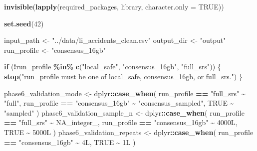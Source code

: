 \documentclass[
]{article}
\newenvironment{Shaded}{\begin{snugshade}}{\end{snugshade}}
\newcommand{\AttributeTok}[1]{\textcolor[rgb]{0.13,0.29,0.53}{#1}}
\newcommand{\ConstantTok}[1]{\textcolor[rgb]{0.56,0.35,0.01}{#1}}
\newcommand{\ControlFlowTok}[1]{\textcolor[rgb]{0.13,0.29,0.53}{\textbf{#1}}}
\newcommand{\DataTypeTok}[1]{\textcolor[rgb]{0.13,0.29,0.53}{#1}}
\newcommand{\DecValTok}[1]{\textcolor[rgb]{0.00,0.00,0.81}{#1}}
\newcommand{\FunctionTok}[1]{\textcolor[rgb]{0.13,0.29,0.53}{\textbf{#1}}}
\newcommand{\NormalTok}[1]{#1}
\newcommand{\OtherTok}[1]{\textcolor[rgb]{0.56,0.35,0.01}{#1}}
\newcommand{\SpecialCharTok}[1]{\textcolor[rgb]{0.81,0.36,0.00}{\textbf{#1}}}
\newcommand{\StringTok}[1]{\textcolor[rgb]{0.31,0.60,0.02}{#1}}
\begin{document}
\begin{Shaded}
\begin{Highlighting}[]
\FunctionTok{invisible}\NormalTok{(}\FunctionTok{lapply}\NormalTok{(required\_packages, library, }\AttributeTok{character.only =} \ConstantTok{TRUE}\NormalTok{))}

\FunctionTok{set.seed}\NormalTok{(}\DecValTok{42}\NormalTok{)}

\NormalTok{input\_path }\OtherTok{\textless{}{-}} \StringTok{"../data/li\_accidents\_clean.csv"}
\NormalTok{output\_dir }\OtherTok{\textless{}{-}} \StringTok{"output"}
\NormalTok{run\_profile }\OtherTok{\textless{}{-}} \StringTok{"consensus\_16gb"}

\ControlFlowTok{if}\NormalTok{ (}\SpecialCharTok{!}\NormalTok{run\_profile }\SpecialCharTok{\%in\%} \FunctionTok{c}\NormalTok{(}\StringTok{"local\_safe"}\NormalTok{, }\StringTok{"consensus\_16gb"}\NormalTok{, }\StringTok{"full\_srs"}\NormalTok{)) \{}
  \FunctionTok{stop}\NormalTok{(}\StringTok{"run\_profile must be one of \textquotesingle{}local\_safe\textquotesingle{}, \textquotesingle{}consensus\_16gb\textquotesingle{}, or \textquotesingle{}full\_srs\textquotesingle{}."}\NormalTok{)}
\NormalTok{\}}

\NormalTok{phase6\_validation\_mode }\OtherTok{\textless{}{-}}\NormalTok{ dplyr}\SpecialCharTok{::}\FunctionTok{case\_when}\NormalTok{(}
\NormalTok{  run\_profile }\SpecialCharTok{==} \StringTok{"full\_srs"} \SpecialCharTok{\textasciitilde{}} \StringTok{"full"}\NormalTok{,}
\NormalTok{  run\_profile }\SpecialCharTok{==} \StringTok{"consensus\_16gb"} \SpecialCharTok{\textasciitilde{}} \StringTok{"consensus\_sampled"}\NormalTok{,}
  \ConstantTok{TRUE} \SpecialCharTok{\textasciitilde{}} \StringTok{"sampled"}
\NormalTok{)}
\NormalTok{phase6\_validation\_sample\_n }\OtherTok{\textless{}{-}}\NormalTok{ dplyr}\SpecialCharTok{::}\FunctionTok{case\_when}\NormalTok{(}
\NormalTok{  run\_profile }\SpecialCharTok{==} \StringTok{"full\_srs"} \SpecialCharTok{\textasciitilde{}} \ConstantTok{NA\_integer\_}\NormalTok{,}
\NormalTok{  run\_profile }\SpecialCharTok{==} \StringTok{"consensus\_16gb"} \SpecialCharTok{\textasciitilde{}} \DecValTok{4000}\DataTypeTok{L}\NormalTok{,}
  \ConstantTok{TRUE} \SpecialCharTok{\textasciitilde{}} \DecValTok{5000}\DataTypeTok{L}
\NormalTok{)}
\NormalTok{phase6\_validation\_repeats }\OtherTok{\textless{}{-}}\NormalTok{ dplyr}\SpecialCharTok{::}\FunctionTok{case\_when}\NormalTok{(}
\NormalTok{  run\_profile }\SpecialCharTok{==} \StringTok{"consensus\_16gb"} \SpecialCharTok{\textasciitilde{}} \DecValTok{4}\DataTypeTok{L}\NormalTok{,}
  \ConstantTok{TRUE} \SpecialCharTok{\textasciitilde{}} \DecValTok{1}\DataTypeTok{L}
\NormalTok{)}


\end{Highlighting}
\end{Shaded}
\end{document}
